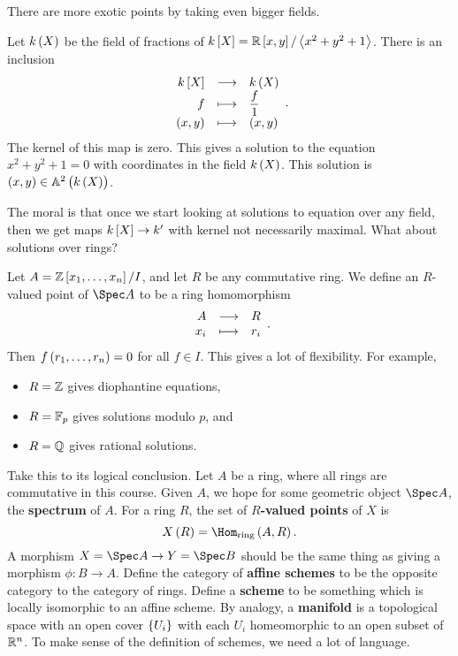 
There are more exotic points by taking even bigger fields.

\begin{example*}
Let $ k\br{X} $ be the field of fractions of $ k\sbr{X} = \RR\sbr{x, y} / \abr{x^2 + y^2 + 1} $. There is an inclusion
$$ \functions{k\sbr{X}}{k\br{X}}{f}{\dfrac{f}{1}}{\br{x, y}}{\br{x, y}}. $$
The kernel of this map is zero. This gives a solution to the equation $ x^2 + y^2 + 1 = 0 $ with coordinates in the field $ k\br{X} $. This solution is $ \br{x, y} \in \AA^2\br{k\br{X}} $.
\end{example*}

The moral is that once we start looking at solutions to equation over any field, then we get maps $ k\sbr{X} \to k' $ with kernel not necessarily maximal. What about solutions over rings?

\pagebreak

\begin{example*}
Let $ A = \ZZ\sbr{x_1, \dots, x_n} / I $, and let $ R $ be any commutative ring. We define an $ R $-valued point of $ \Spec A $ to be a ring homomorphism
$$ \function{A}{R}{x_i}{r_i}. $$
Then $ f\br{r_1, \dots, r_n} = 0 $ for all $ f \in I $. This gives a lot of flexibility. For example,
\begin{itemize}
\item $ R = \mathbb{Z} $ gives diophantine equations,
\item $ R = \mathbb{F}_p $ gives solutions modulo $ p $, and
\item $ R = \mathbb{Q} $ gives rational solutions.
\end{itemize}
\end{example*}

Take this to its logical conclusion. Let $ A $ be a ring, where all rings are commutative in this course. Given $ A $, we hope for some geometric object $ \Spec A $, the \textbf{spectrum} of $ A $. For a ring $ R $, the set of \textbf{$ R $-valued points} of $ X $ is
$$ X\br{R} = \Hom_{\text{ring}}\br{A, R}. $$
A morphism $ X = \Spec A \to Y = \Spec B $ should be the same thing as giving a morphism $ \phi : B \to A $. Define the category of \textbf{affine schemes} to be the opposite category to the category of rings. Define a \textbf{scheme} to be something which is locally isomorphic to an affine scheme. By analogy, a \textbf{manifold} is a topological space with an open cover $ \cbr{U_i} $ with each $ U_i $ homeomorphic to an open subset of $ \mathbb{R}^n $. To make sense of the definition of schemes, we need a lot of language.

